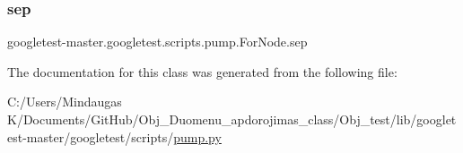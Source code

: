 \mbox{\label{classgoogletest-master_1_1googletest_1_1scripts_1_1pump_1_1_for_node_ad2d499953efa5aaafeb6606549e18abb}} 
\subsubsection{\texorpdfstring{sep}{sep}}
{\footnotesize\ttfamily googletest-\/master.\+googletest.\+scripts.\+pump.\+For\+Node.\+sep}



The documentation for this class was generated from the following file\+:\begin{DoxyCompactItemize}
\item 
C\+:/\+Users/\+Mindaugas K/\+Documents/\+Git\+Hub/\+Obj\+\_\+\+Duomenu\+\_\+apdorojimas\+\_\+class/\+Obj\+\_\+test/lib/googletest-\/master/googletest/scripts/\mbox{\hyperlink{_obj__test_2lib_2googletest-master_2googletest_2scripts_2pump_8py}{pump.\+py}}\end{DoxyCompactItemize}
